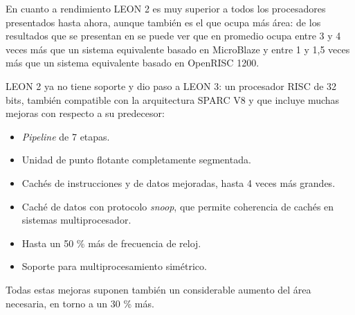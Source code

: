 En cuanto a rendimiento LEON 2 es muy superior a todos los procesadores presentados hasta ahora, aunque también es el que ocupa más área: de los resultados que se presentan en \cite{Etiqueta32} se puede ver que en promedio ocupa entre 3 y 4 veces más que un sistema equivalente basado en MicroBlaze y entre 1 y 1,5 veces más que un sistema equivalente basado en OpenRISC 1200. 

LEON 2 ya no tiene soporte y dio paso a LEON 3: un procesador RISC de 32 bits, también compatible con la arquitectura SPARC V8 y que incluye muchas mejoras con respecto a su predecesor:

\begin{itemize}
		 
	       \item \textit{Pipeline} de 7 etapas.
		 \item Unidad de punto flotante completamente segmentada.
		 \item Cachés de instrucciones y de datos mejoradas, hasta 4 veces más grandes.
 		\item  Caché de datos con protocolo \textit{snoop}, que permite coherencia de cachés en sistemas multiprocesador.
		\item Hasta un 50 \% más de frecuencia de reloj.
		\item Soporte para multiprocesamiento simétrico.
		\end{itemize}
   
Todas estas mejoras suponen también un considerable aumento del área necesaria, en torno a un 30 \% más.

